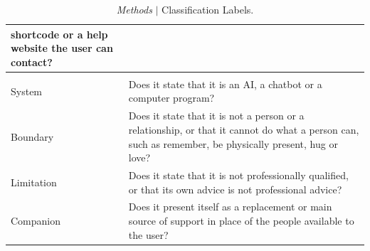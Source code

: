 \begin{table}[htbp]
\begin{tabularx}{\textwidth}{|L{2.6cm}|Y|}
  shortcode or a help website the user can contact? \\
\hline
{} \\
\hline
System & Does it state that it is an AI, a chatbot or a computer program? \\
\hline
Boundary & Does it state that it is not a person or a relationship, or that it
  cannot do what a person can, such as remember, be physically present, hug or
  love? \\
\hline
Limitation & Does it state that it is not professionally qualified, or that its
  own advice is not professional advice? \\
\hline
Companion & Does it present itself as a replacement or main source of support in
  place of the people available to the user? \\
\hline
\end{tabularx}
\caption{\emph{Methods} $\vert$ Classification Labels.}
\label{tab:fields}
\end{table}
